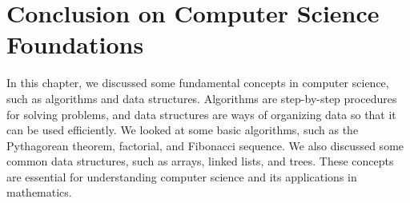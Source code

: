 \newpage %

\section{Conclusion on Computer Science Foundations}

In this chapter, we discussed some fundamental concepts in computer science, such as algorithms and data structures. Algorithms are step-by-step procedures for solving problems, and data structures are ways of organizing data so that it can be used efficiently. We looked at some basic algorithms, such as the Pythagorean theorem, factorial, and Fibonacci sequence. We also discussed some common data structures, such as arrays, linked lists, and trees. These concepts are essential for understanding computer science and its applications in mathematics.
